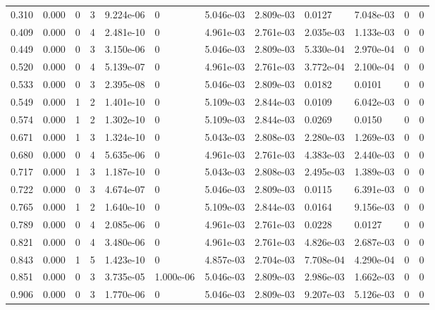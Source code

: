 \documentclass[preview]{standalone}
\begin{document}
{{\begin{tabular}{L{1.2cm}C{1.2cm} C{0.3cm}C{0.5cm} C{1.4cm}C{1.4cm} C{1.4cm}C{1.4cm} C{1.6cm}C{1.6cm} C{1.6cm}C{1.6cm}}
  0.310  &  0.000  & 0     &  3 &  9.224e-06  & 0  &  5.046e-03&   2.809e-03& 0.0127 & 7.048e-03   &  0 & 0  \\ 
  0.409  &  0.000  & 0     &  4 &  2.481e-10  & 0  &  4.961e-03&   2.761e-03& 2.035e-03 & 1.133e-03   &  0 & 0  \\ 
  0.449  &  0.000  & 0     &  3 &  3.150e-06  & 0  &  5.046e-03&   2.809e-03& 5.330e-04 & 2.970e-04   &  0 & 0  \\ 
  0.520  &  0.000  & 0     &  4 &  5.139e-07  & 0  &  4.961e-03&   2.761e-03& 3.772e-04 & 2.100e-04   &  0 & 0  \\ 
  0.533  &  0.000  & 0     &  3 &  2.395e-08  & 0  &  5.046e-03&   2.809e-03& 0.0182 & 0.0101   &  0 & 0  \\ 
  0.549  &  0.000  & 1     &  2 &  1.401e-10  & 0  &  5.109e-03&   2.844e-03& 0.0109 & 6.042e-03   &  0 & 0  \\ 
  0.574  &  0.000  & 1     &  2 &  1.302e-10  & 0  &  5.109e-03&   2.844e-03& 0.0269 & 0.0150   &  0 & 0  \\ 
  0.671  &  0.000  & 1     &  3 &  1.324e-10  & 0  &  5.043e-03&   2.808e-03& 2.280e-03 & 1.269e-03   &  0 & 0  \\ 
  0.680  &  0.000  & 0     &  4 &  5.635e-06  & 0  &  4.961e-03&   2.761e-03& 4.383e-03 & 2.440e-03   &  0 & 0  \\ 
  0.717  &  0.000  & 1     &  3 &  1.187e-10  & 0  &  5.043e-03&   2.808e-03& 2.495e-03 & 1.389e-03   &  0 & 0  \\ 
  0.722  &  0.000  & 0     &  3 &  4.674e-07  & 0  &  5.046e-03&   2.809e-03& 0.0115 & 6.391e-03   &  0 & 0  \\ 
  0.765  &  0.000  & 1     &  2 &  1.640e-10  & 0  &  5.109e-03&   2.844e-03& 0.0164 & 9.156e-03   &  0 & 0  \\ 
  0.789  &  0.000  & 0     &  4 &  2.085e-06  & 0  &  4.961e-03&   2.761e-03& 0.0228 & 0.0127   &  0 & 0  \\ 
  0.821  &  0.000  & 0     &  4 &  3.480e-06  & 0  &  4.961e-03&   2.761e-03& 4.826e-03 & 2.687e-03   &  0 & 0  \\ 
  0.843  &  0.000  & 1     &  5 &  1.423e-10  & 0  &  4.857e-03&   2.704e-03& 7.708e-04 & 4.290e-04   &  0 & 0  \\ 
  0.851  &  0.000  & 0     &  3 &  3.735e-05  & 1.000e-06  &  5.046e-03&   2.809e-03& 2.986e-03 & 1.662e-03   &  0 & 0  \\ 
  0.906  &  0.000  & 0     &  3 &  1.770e-06  & 0  &  5.046e-03&   2.809e-03& 9.207e-03 & 5.126e-03   &  0 & 0  \\ 

\end{tabular}}}
\end{document}
